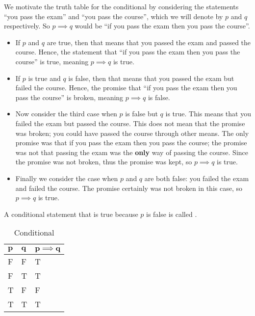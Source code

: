 We motivate the truth table for the conditional by considering the statements ``you pass the exam'' and ``you pass the course'', which we will denote by $p$ and $q$ respectively. So $p \implies q$ would be ``if you pass the exam then you pass the course''.
\begin{itemize}
    \item If $p$ and $q$ are true, then that means that you passed the exam and passed the course. Hence, the statement that ``if you pass the exam then you pass the course'' is true, meaning $p \implies q$ is true.
    \item If $p$ is true and $q$ is false, then that means that you passed the exam but failed the course. Hence, the promise that ``if you pass the exam then you pass the course'' is broken, meaning $p \implies q$ is false.
    \item Now consider the third case when $p$ is false but $q$ is true. This means that you failed the exam but passed the course. This does not mean that the promise was broken; you could have passed the course through other means. The only promise was that if you pass the exam then you pass the course; the promise was not that passing the exam was the \textbf{only} way of passing the course. Since the promise was not broken, thus the promise was kept, so $p \implies q$ is true.
    \item Finally we consider the case when $p$ and $q$ are both false: you failed the exam and failed the course. The promise certainly was not broken in this case, so $p \implies q$ is true.
\end{itemize}
\begin{remark}
    A conditional statement that is true because $p$ is false is called .
\end{remark}

\begin{table}[h]
    \centering
    \begin{tabular}{|l|l||l|}
        \hline
        $\boldsymbol{p}$ & $\boldsymbol{q}$ & $\boldsymbol{p\implies q}$ \\ \hline
        F   & F   & T             \\ \hline
        F   & T   & T             \\ \hline
        T   & F   & F             \\ \hline
        T   & T   & T             \\ \hline
    \end{tabular}
    \caption{Conditional}
\end{table}

